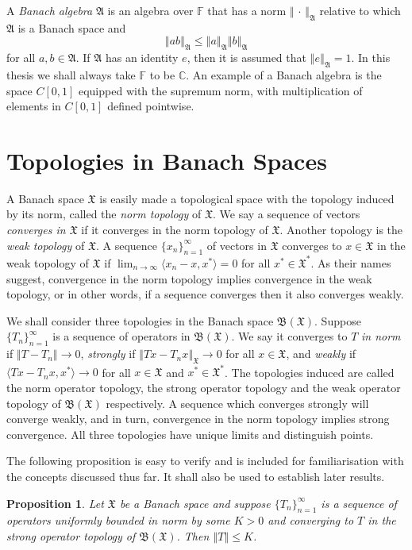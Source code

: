 \documentclass[mstat,12pt]{unswthesis}  %
\newcommand{\C}{\mathbb{C}}
\newcommand{\F}{\mathbb{F}}
\newcommand{\B}{\mathfrak{B}}
\newcommand{\X}{\mathfrak{X}}
\def\ip<#1,#2>{\langle #1,#2 \rangle}
\def\norm#1{\left \Vert #1 \right \Vert}
\newtheorem{proposition}[theorem]{Proposition}
\numberwithin{equation}{section}
\begin{document}
A {\em Banach algebra} $\mathfrak{A}$ is an algebra over $\F$ that has a norm
$\norm{\,\cdot\,}_{\mathfrak{A}}$ relative to which $\mathfrak{A}$ is a Banach
space and
\[\norm{ab}_{\mathfrak{A}}\leq\norm{a}_{\mathfrak{A}}\norm{b}_{\mathfrak{A}}\]
for all $a,b\in\mathfrak{A}$. If $\mathfrak{A}$ has an identity $e$, then it is
assumed that $\norm{e}_{\mathfrak{A}}=1$. In this thesis we shall always take
$\F$ to be $\C$. An example of a Banach algebra is the space $C[0,1]$ equipped
with the supremum norm, with multiplication of elements in $C[0,1]$ defined
pointwise.


\section{Topologies in Banach Spaces}\label{topologies}

A Banach space $\X$ is easily made a topological space with the topology induced
by its norm, called the {\em norm topology} of $\X$. We say a sequence of
vectors {\em converges in $\X$} if it converges in the norm topology of $\X$.
Another
topology is the {\em weak topology} of $\X$. A sequence $\{x_n\}_{n=1}^{\infty}$
of vectors in $\X$ converges to $x\in\X$ in the weak topology of $\X$ if
$\lim_{n\rightarrow\infty}\ip<x_n-x,x^*>=0$ for all $x^*\in\X^*$. As their names
suggest, convergence in the norm topology implies convergence in the weak
topology, or in other words, if a sequence converges then it also converges
weakly.

We shall consider three topologies in the Banach space $\B(\X)$.
Suppose $\{T_n\}_{n=1}^{\infty}$ is a sequence of operators in $\B(\X)$.
We say it
converges to $T$ {\em in norm} if $\norm{T-T_n}\rightarrow 0$, {\em strongly} if
$\norm{Tx-T_nx}_{\X}\rightarrow 0$ for all $x\in\X$, and {\em weakly} if
$\ip<Tx-T_nx,x^*>\rightarrow 0$ for all $x\in\X$ and $x^*\in\X^*$. The 
topologies
induced are called the norm operator topology, the strong operator topology and
the weak
operator topology of $\B(\X)$ respectively. A sequence which converges strongly
will converge weakly, and in turn, convergence in the norm topology implies
strong convergence. All three topologies have unique limits and distinguish
points.

The following proposition is easy to verify and is included for familiarisation
with the concepts discussed thus far. It shall also be used to establish later
results.

\begin{proposition}\label{SOT convergence}
Let $\X$ be a Banach space and suppose $\{T_n\}_{n=1}^{\infty}$ is a sequence of
operators uniformly bounded in norm by some $K>0$ and converging to $T$
in the strong operator topology of $\B(\X)$. Then $\norm{T}\leq
K$.
\end{proposition}
\end{document}
